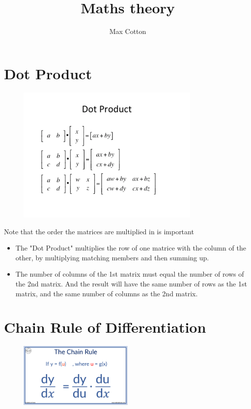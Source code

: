 \documentclass[10pt,a4paper]{article}
\title{Maths theory}
\author{Max Cotton}
\date{}
\begin{document}
\maketitle

\section{Dot Product}

\begin{figure}[h!]
\centering
\includegraphics[width=0.8\textwidth]{src/images/dot-product.png}
\end{figure}

Note that the order the matrices are multiplied in is important

\begin{itemize}
    \item The "Dot Product" multiplies the row of one matrice with the column of the other, by multiplying matching members and then summing up. 
    \item The number of columns of the 1st matrix must equal the number of rows of the 2nd matrix. And the result will have the same number of rows as the 1st matrix, and the same number of columns as the 2nd matrix.
\end{itemize}

\section{Chain Rule of Differentiation}

\begin{figure}[h!]
\centering
\includegraphics[width=0.5\textwidth]{src/images/chain-rule.png}
\end{figure}
\end{document}
